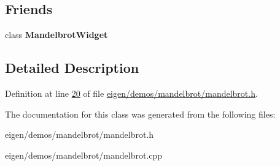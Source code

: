 \subsection*{Friends}
\begin{DoxyCompactItemize}
\item 
\mbox{\label{class_mandelbrot_thread_af1081138fd0752d9428c37c3aaa1ae7c}} 
class {\bfseries Mandelbrot\+Widget}
\end{DoxyCompactItemize}


\subsection{Detailed Description}


Definition at line \hyperlink{eigen_2demos_2mandelbrot_2mandelbrot_8h_source_l00020}{20} of file \hyperlink{eigen_2demos_2mandelbrot_2mandelbrot_8h_source}{eigen/demos/mandelbrot/mandelbrot.\+h}.



The documentation for this class was generated from the following files\+:\begin{DoxyCompactItemize}
\item 
eigen/demos/mandelbrot/mandelbrot.\+h\item 
eigen/demos/mandelbrot/mandelbrot.\+cpp\end{DoxyCompactItemize}
